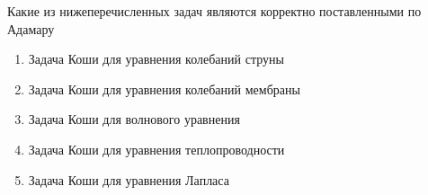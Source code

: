 Какие из нижеперечисленных задач являются корректно поставленными по Адамару

\begin{enumerate}[label=\arabic*)]
    \item Задача Коши для уравнения колебаний струны
    \item Задача Коши для уравнения колебаний мембраны
    \item Задача Коши для волнового уравнения
    \item Задача Коши для уравнения теплопроводности
    \item Задача Коши для уравнения Лапласа
\end{enumerate}

